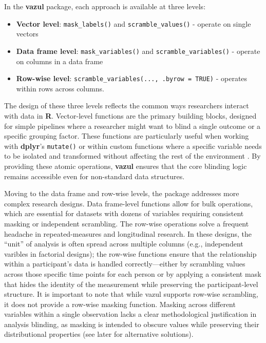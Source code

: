 In the \textbf{vazul} package, each approach is available at three levels:

\begin{itemize}
\tightlist
\item
  \textbf{Vector level}: \texttt{mask\_labels()} and \texttt{scramble\_values()} - operate on single vectors
\item
  \textbf{Data frame level}: \texttt{mask\_variables()} and \texttt{scramble\_variables()} - operate on columns in a data frame
\item
  \textbf{Row-wise level}: \texttt{scramble\_variables(...,\ .byrow\ =\ TRUE)} - operates within rows across columns.
\end{itemize}

The design of these three levels reflects the common ways researchers interact with data in \textbf{R}. Vector-level functions are the primary building blocks, designed for simple pipelines where a researcher might want to blind a single outcome or a specific grouping factor. These functions are particularly useful when working with \textbf{dplyr}'s \texttt{mutate()} or within custom functions where a specific variable needs to be isolated and transformed without affecting the rest of the environment \citep{Wickham2025-eh}. By providing these atomic operations, \textbf{vazul} ensures that the core blinding logic remains accessible even for non-standard data structures.

Moving to the data frame and row-wise levels, the package addresses more complex research designs. Data frame-level functions allow for bulk operations, which are essential for datasets with dozens of variables requiring consistent masking or independent scrambling. The row-wise operations solve a frequent headache in repeated-measures and longitudinal research. In these designs, the ``unit'' of analysis is often spread across multiple columns (e.g., independent varibles in factorial designs); the row-wise functions ensure that the relationship within a participant's data is handled correctly---either by scrambling values across those specific time points for each person or by applying a consistent mask that hides the identity of the measurement while preserving the participant-level structure. It is important to note that while vazul supports row-wise scrambling, it does not provide a row-wise masking function. Masking across different variables within a single observation lacks a clear methodological justification in analysis blinding, as masking is intended to obscure values while preserving their distributional properties (see later for alternative solutions).

